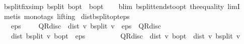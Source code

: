\begin{isabellebody}
\isamarkupfalse%
\ {\isasymL}\isactrlsub b{\isacharunderscore}{\kern0pt}split{\isacharunderscore}{\kern0pt}fix{\isacharbrackleft}{\kern0pt}simp{\isacharbrackright}{\kern0pt}{\isacharcolon}{\kern0pt}\ {\isachardoublequoteopen}{\isasymL}\isactrlsub b{\isacharunderscore}{\kern0pt}split\ {\isasymnu}\isactrlsub b{\isacharunderscore}{\kern0pt}opt\ {\isacharequal}{\kern0pt}\ {\isasymnu}\isactrlsub b{\isacharunderscore}{\kern0pt}opt{\isachardoublequoteclose}\isanewline
%
\isadelimproof
\ \ %
\endisadelimproof
%
\isatagproof
{}\isamarkupfalse%
\ {\isasymL}\isactrlsub b{\isacharunderscore}{\kern0pt}lim\ {\isasymL}\isactrlsub b{\isacharunderscore}{\kern0pt}split{\isacharunderscore}{\kern0pt}tendsto{\isacharunderscore}{\kern0pt}opt\ the{\isacharunderscore}{\kern0pt}equality\ limI\isanewline
\ \ \isamarkupfalse%
\ {\isacharparenleft}{\kern0pt}metis\ {\isacharparenleft}{\kern0pt}mono{\isacharunderscore}{\kern0pt}tags{\isacharcomma}{\kern0pt}\ lifting{\isacharparenright}{\kern0pt}{\isacharparenright}{\kern0pt}%
\endisatagproof
{\isafoldproof}%
%
\isadelimproof
\isanewline
%
\endisadelimproof
\isanewline
{}\isamarkupfalse%
\ dist{\isacharunderscore}{\kern0pt}{\isasymL}\isactrlsub b{\isacharunderscore}{\kern0pt}split{\isacharunderscore}{\kern0pt}opt{\isacharunderscore}{\kern0pt}eps{\isacharcolon}{\kern0pt}\isanewline
\ \ \ {\isachardoublequoteopen}eps\ {\isachargreater}{\kern0pt}\ {}{\isachardoublequoteclose}\ {\isachardoublequoteopen}{}\ {\isacharasterisk}{\kern0pt}\ QR{\isacharunderscore}{\kern0pt}disc\ {\isacharasterisk}{\kern0pt}\ dist\ v\ {\isacharparenleft}{\kern0pt}{\isasymL}\isactrlsub b{\isacharunderscore}{\kern0pt}split\ v{\isacharparenright}{\kern0pt}\ {\isacharless}{\kern0pt}\ eps\ {\isacharasterisk}{\kern0pt}\ {\isacharparenleft}{\kern0pt}{}{\isacharminus}{\kern0pt}QR{\isacharunderscore}{\kern0pt}disc{\isacharparenright}{\kern0pt}{\isachardoublequoteclose}\isanewline
\ \ \ {\isachardoublequoteopen}dist\ {\isacharparenleft}{\kern0pt}{\isasymL}\isactrlsub b{\isacharunderscore}{\kern0pt}split\ v{\isacharparenright}{\kern0pt}\ {\isasymnu}\isactrlsub b{\isacharunderscore}{\kern0pt}opt\ {\isacharless}{\kern0pt}\ eps\ {\isacharslash}{\kern0pt}\ {}{\isachardoublequoteclose}\isanewline
%
\isadelimproof
%
\endisadelimproof
%
\isatagproof
{}\isamarkupfalse%
\ {\isacharminus}{\kern0pt}\isanewline
\ \ \isamarkupfalse%
\ {\isachardoublequoteopen}{\isacharparenleft}{\kern0pt}{}\ {\isacharminus}{\kern0pt}\ QR{\isacharunderscore}{\kern0pt}disc{\isacharparenright}{\kern0pt}\ {\isacharasterisk}{\kern0pt}\ dist\ v\ {\isasymnu}\isactrlsub b{\isacharunderscore}{\kern0pt}opt\ {\isasymle}\ dist\ v\ {\isacharparenleft}{\kern0pt}{\isasymL}\isactrlsub b{\isacharunderscore}{\kern0pt}split\ v{\isacharparenright}{\kern0pt}{\isachardoublequoteclose}\isanewline

\end{isabellebody}
